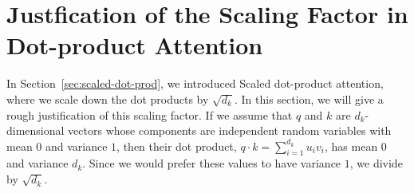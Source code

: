 \section*{Justfication of the Scaling Factor in Dot-product Attention}

In Section~\ref{sec:scaled-dot-prod}, we introduced Scaled dot-product attention, where we scale down the dot products by $\sqrt{d_k}$.   In this section, we will give a rough justification of this scaling factor.  If we assume that $q$ and $k$ are $d_k$-dimensional vectors whose components are independent random variables with mean $0$ and variance $1$, then their dot product, $q \cdot k = \sum_{i=1}^{d_k} u_iv_i$, has mean $0$ and variance $d_k$.  Since we would prefer these values to have variance $1$, we divide by $\sqrt{d_k}$.  




\iffalse

In this section, we will give a rough justification of this scaling factor, that is, we will show that for any two vectors, $\vec{u}$ and $\vec{v}$, whose variance and mean are $1$ and $0$ respectively, the variance and the mean of the dot product are $d_k$ and $0$ respectively. Therefore, dividing by $\sqrt{d_k}$ ensures that each component of the attention logits are normalized. The repeated layer norms at each transformer layer encourage $\vec{u}$ and $\vec{v}$ to be normalized. 


\begin{align*}
    E[<\vec{u},\vec{v}>] & =  \sum_k E[u_i v_i] &\text{By linearity of expectation} \\
    & =\sum_k E[u_i]E[v_i] & \text{Assuming independence} \\
    & = 0
\end{align*}

\begin{align*}
    E[(<\vec{u},\vec{v}>-E[<\vec{u},\vec{v}>])^2]  & = E[(<\vec{u},\vec{v}>)^2] - E[<\vec{u},\vec{v}>]^2 \\
    & = E[(<\vec{u},\vec{v}>)^2] \\
    & =  \sum_k E[{u_i}^2] E[{v_i}^2] &\text{By linearity of expectation and indepedence} \\
    & = d_k
\end{align*}


\fi
